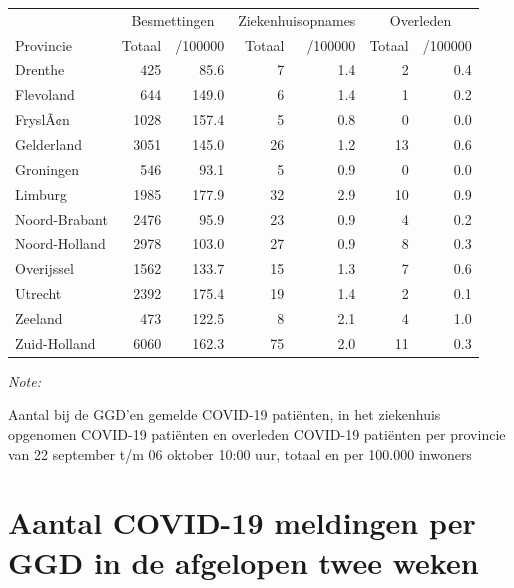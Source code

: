 \documentclass[
  english,
  man,floatsintext]{apa6}
\begin{document}
\begin{table}
\centering
\begin{threeparttable}
\begin{tabular}{lrrrrrr}
\toprule
\multicolumn{1}{c}{ } & \multicolumn{2}{c}{Besmettingen} & \multicolumn{2}{c}{Ziekenhuisopnames} & \multicolumn{2}{c}{Overleden} \\
\cmidrule(l{3pt}r{3pt}){2-3} \cmidrule(l{3pt}r{3pt}){4-5} \cmidrule(l{3pt}r{3pt}){6-7}
Provincie & Totaal & /100000 & Totaal & /100000 & Totaal & /100000\\
\midrule
Drenthe & 425 & 85.6 & 7 & 1.4 & 2 & 0.4\\
Flevoland & 644 & 149.0 & 6 & 1.4 & 1 & 0.2\\
FryslÃ¢n & 1028 & 157.4 & 5 & 0.8 & 0 & 0.0\\
Gelderland & 3051 & 145.0 & 26 & 1.2 & 13 & 0.6\\
Groningen & 546 & 93.1 & 5 & 0.9 & 0 & 0.0\\
Limburg & 1985 & 177.9 & 32 & 2.9 & 10 & 0.9\\
Noord-Brabant & 2476 & 95.9 & 23 & 0.9 & 4 & 0.2\\
Noord-Holland & 2978 & 103.0 & 27 & 0.9 & 8 & 0.3\\
Overijssel & 1562 & 133.7 & 15 & 1.3 & 7 & 0.6\\
Utrecht & 2392 & 175.4 & 19 & 1.4 & 2 & 0.1\\
Zeeland & 473 & 122.5 & 8 & 2.1 & 4 & 1.0\\
Zuid-Holland & 6060 & 162.3 & 75 & 2.0 & 11 & 0.3\\
\bottomrule
\end{tabular}
\begin{tablenotes}
\item \textit{Note: } 
\item Aantal bij de GGD’en gemelde COVID-19 patiënten, in het ziekenhuis opgenomen COVID-19 patiënten en overleden COVID-19 patiënten per provincie van 22 september t/m 06 oktober 10:00 uur, totaal en per 100.000 inwoners
\end{tablenotes}
\end{threeparttable}
\end{table}

\newpage

\hypertarget{aantal-covid-19-meldingen-per-ggd-in-de-afgelopen-twee-weken}{%
\section{Aantal COVID-19 meldingen per GGD in de afgelopen twee weken}\label{aantal-covid-19-meldingen-per-ggd-in-de-afgelopen-twee-weken}}
\end{document}

